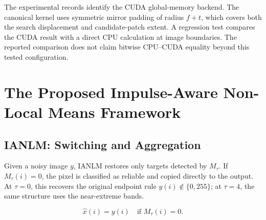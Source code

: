 \documentclass[pdflatex,iicol,sn-mathphys-num]{sn-jnl}
\newif\ifshowportuguese
\newcommand{\pt}[1]{\ifshowportuguese\par\begingroup\small\color{blue!55!black}\noindent\textbf{PT: }#1\par\endgroup\fi}
\begin{document}
The experimental records identify the CUDA global-memory backend. The canonical kernel uses symmetric mirror padding of radius $f+t$, which covers both the search displacement and candidate-patch extent. A regression test compares the CUDA result with a direct CPU calculation at image boundaries. The reported comparison does not claim bitwise CPU--CUDA equality beyond this tested configuration.
\pt{Os registros experimentais identificam o backend CUDA de memória global. O kernel canônico usa padding espelhado simétrico de raio $f+t$, que cobre tanto o deslocamento de busca quanto a extensão do patch candidato. Um teste de regressão compara o resultado CUDA com um cálculo CPU direto nas bordas da imagem. A comparação reportada não reivindica igualdade bit a bit CPU--CUDA além dessa configuração testada.}


\section{The Proposed Impulse-Aware Non-Local Means Framework}
\label{sec:method}

\subsection{IANLM: Switching and Aggregation}
\label{subsec:ianlm}

Given a noisy image $y$, IANLM restores only targets detected by $M_\tau$. If $M_\tau(i)=0$, the pixel is classified as reliable and copied directly to the output. At $\tau=0$, this recovers the original endpoint rule $y(i)\notin\{0,255\}$; at $\tau=4$, the same structure uses the near-extreme bands.
\pt{Dada uma imagem ruidosa $y$, o IANLM restaura apenas alvos detectados por $M_\tau$. Se $M_\tau(i)=0$, o pixel é classificado como confiável e copiado diretamente para a saída. Em $\tau=0$, isso recupera a regra original dos extremos $y(i)\notin\{0,255\}$; em $\tau=4$, a mesma estrutura usa as faixas próximas dos extremos.}
\begin{equation}
\hat{x}(i)=y(i)\quad\text{if }M_\tau(i)=0.
\label{eq:ianlm_switching_clean}
\end{equation}
\end{document}
